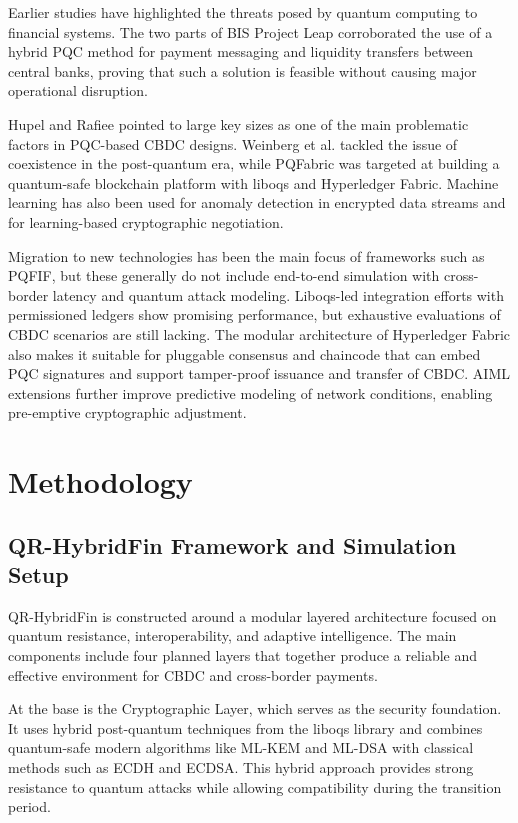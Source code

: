 \documentclass[pdflatex,sn-basic,english]{sn-jnl}
\begin{document}
Earlier studies have highlighted the threats posed by quantum computing to financial systems. The two parts of BIS Project Leap corroborated the use of a hybrid PQC method for payment messaging and liquidity transfers between central banks, proving that such a solution is feasible without causing major operational disruption.

Hupel and Rafiee pointed to large key sizes as one of the main problematic factors in PQC-based CBDC designs. Weinberg et al. tackled the issue of coexistence in the post-quantum era, while PQFabric was targeted at building a quantum-safe blockchain platform with liboqs and Hyperledger Fabric. Machine learning has also been used for anomaly detection in encrypted data streams and for learning-based cryptographic negotiation.

Migration to new technologies has been the main focus of frameworks such as PQFIF, but these generally do not include end-to-end simulation with cross-border latency and quantum attack modeling. Liboqs-led integration efforts with permissioned ledgers show promising performance, but exhaustive evaluations of CBDC scenarios are still lacking. The modular architecture of Hyperledger Fabric also makes it suitable for pluggable consensus and chaincode that can embed PQC signatures and support tamper-proof issuance and transfer of CBDC. AIML extensions further improve predictive modeling of network conditions, enabling pre-emptive cryptographic adjustment.

\section{Methodology}

\subsection{QR-HybridFin Framework and Simulation Setup}

QR-HybridFin is constructed around a modular layered architecture focused on quantum resistance, interoperability, and adaptive intelligence. The main components include four planned layers that together produce a reliable and effective environment for CBDC and cross-border payments.

At the base is the Cryptographic Layer, which serves as the security foundation. It uses hybrid post-quantum techniques from the liboqs library and combines quantum-safe modern algorithms like ML-KEM and ML-DSA with classical methods such as ECDH and ECDSA. This hybrid approach provides strong resistance to quantum attacks while allowing compatibility during the transition period.
\end{document}
